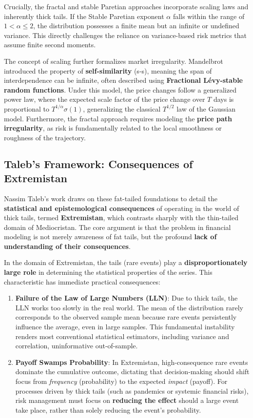 \documentclass{ieeetj}
\begin{document}
Crucially, the fractal and stable Paretian approaches incorporate scaling laws and inherently thick tails. If the Stable Paretian exponent $\alpha$ falls within the range of $1 < \alpha \le2$, the distribution possesses a finite mean but an infinite or undefined variance. This directly challenges the reliance on variance-based risk metrics that assume finite second moments.

The concept of scaling further formalizes market irregularity. Mandelbrot introduced the property of \textbf{self-similarity} (s-s), meaning the span of interdependence can be infinite, often described using \textbf{Fractional Lévy-stable random functions}. Under this model, the price changes follow a generalized power law, where the expected scale factor of the price change over $T$ days is proportional to $T^{1 / \alpha}\sigma(1)$, generalizing the classical $T^{1/2}$
  law of the Gaussian model. Furthermore, the fractal approach requires modeling the \textbf{price path irregularity}, as risk is fundamentally related to the local smoothness or roughness of the trajectory.

\subsection{Taleb’s Framework: Consequences of Extremistan}

Nassim Taleb's work draws on these fat-tailed foundations to detail the \textbf{statistical and epistemological consequences} of operating in the world of thick tails, termed \textbf{Extremistan}, which contrasts sharply with the thin-tailed domain of Mediocristan. The core argument is that the problem in financial modeling is not merely awareness of fat tails, but the profound \textbf{lack of understanding of their consequences}.

In the domain of Extremistan, the tails (rare events) play a \textbf{disproportionately large role} in determining the statistical properties of the series. This characteristic has immediate practical consequences:

\begin{enumerate}
    \item \textbf{Failure of the Law of Large Numbers (LLN)}: Due to thick tails, the LLN works too slowly in the real world. The mean of the distribution rarely corresponds to the observed sample mean because rare events persistently influence the average, even in large samples. This fundamental instability renders most conventional statistical estimators, including variance and correlation, uninformative out-of-sample.

    \item \textbf{Payoff Swamps Probability}: In Extremistan, high-consequence rare events dominate the cumulative outcome, dictating that decision-making should shift focus from \textit{frequency} (probability) to the expected \textit{impact} (payoff). For processes driven by thick tails (such as pandemics or systemic financial risks), risk management must focus on \textbf{reducing the effect} should a large event take place, rather than solely reducing the event's probability.
\end{enumerate}
\end{document}
